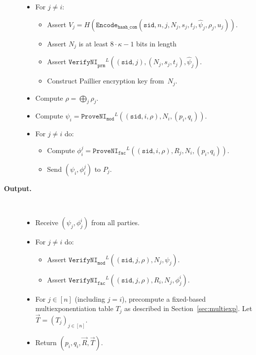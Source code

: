 \documentclass[11pt]{article}
\newcommand{\sid}{\ensuremath{\mathtt{sid}}}
\newcommand{\proveni}[1]{\ensuremath{\mathtt{ProveNI}_{\mathtt{#1}}}}
\newcommand{\verifyni}[1]{\ensuremath{\mathtt{VerifyNI}_{\mathtt{#1}}}}
\newcommand{\Encode}[1]{\ensuremath{\mathtt{Encode}_{\mathtt{#1}}}}
\newcommand{\?}[1]{\stackrel{?}{#1}}
\begin{document}
\begin{description}
\begin{itemize}
      \item For $j \neq i$:
        \begin{itemize}
          \item Assert $V_j =
            H(\Encode{hash\_com}(\sid, n, j, N_j, s_j, t_j, \hat{\psi}_j, \rho_j, u_j))$.
          \item Assert $N_j$ is at least $8 \cdot \kappa - 1$ bits in length
          \item Assert $\verifyni{prm}^L((\sid, j), (N_j, s_j, t_j), \hat{\psi}_j)$.
          \item Construct Paillier encryption key from~$N_j$.
        \end{itemize}
\item Compute $\rho=\bigoplus_j \rho_j$.
      \item Compute $\psi_i = \proveni{mod}^L((\sid, i, \rho), N_i, (p_i, q_i))$.
      \item For $j\neq i$ do:
        \begin{itemize}
          \item Compute $\phi_i^j = \proveni{fac}^{L}((\sid, i, \rho), R_j, N_i, (p_i, q_i))$.
          \item Send $(\psi_i, \phi_i^j)$ to $P_j$.
        \end{itemize}

    \end{itemize}

  \item[\textbf{Output.}] \

    \begin{itemize}
      \item Receive $(\psi_j, \phi_j^i)$ from all parties.
      \item For $j \neq i$ do: 
        \begin{itemize}
          \item Assert $\verifyni{mod}^L((\sid, j, \rho), N_j, \psi_j)$.
          \item Assert $\verifyni{fac}^{L}((\sid, j, \rho), R_i, N_j, \phi_j^i)$.
        \end{itemize}

      \item For $j \in [n]$ (including $j=i$), precompute a fixed-based multiexponentiation table $T_j$ as described in Section~\ref{sec:multiexp}. Let $\vec{T} = (T_j)_{j \in [n]}$.
      \item Return $(p_i, q_i, \vec{R}, \vec{T})$.
    \end{itemize}

\end{description}
\end{document}

